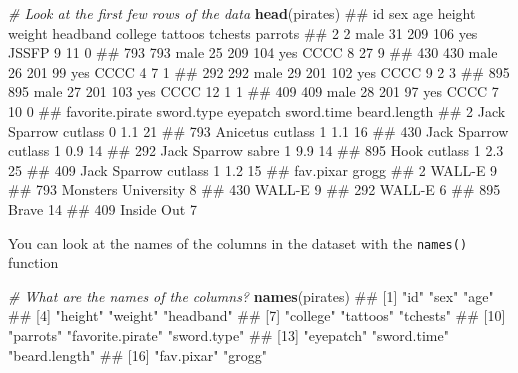 \documentclass[]{book}
\newenvironment{Shaded}{\begin{snugshade}}{\end{snugshade}}
\newcommand{\KeywordTok}[1]{\textcolor[rgb]{0.13,0.29,0.53}{\textbf{#1}}}
\newcommand{\CommentTok}[1]{\textcolor[rgb]{0.56,0.35,0.01}{\textit{#1}}}
\newcommand{\NormalTok}[1]{#1}
\theoremstyle{definition}
\theoremstyle{definition}
\theoremstyle{remark}
\begin{document}
\begin{Shaded}
\begin{Highlighting}[]
\CommentTok{# Look at the first few rows of the data}
\KeywordTok{head}\NormalTok{(pirates)}
\NormalTok{##      id  sex age height weight headband college tattoos tchests parrots}
\NormalTok{## 2     2 male  31    209    106      yes   JSSFP       9      11       0}
\NormalTok{## 793 793 male  25    209    104      yes    CCCC       8      27       9}
\NormalTok{## 430 430 male  26    201     99      yes    CCCC       4       7       1}
\NormalTok{## 292 292 male  29    201    102      yes    CCCC       9       2       3}
\NormalTok{## 895 895 male  27    201    103      yes    CCCC      12       1       1}
\NormalTok{## 409 409 male  28    201     97      yes    CCCC       7      10       0}
\NormalTok{##     favorite.pirate sword.type eyepatch sword.time beard.length}
\NormalTok{## 2      Jack Sparrow    cutlass        0        1.1           21}
\NormalTok{## 793        Anicetus    cutlass        1        1.1           16}
\NormalTok{## 430    Jack Sparrow    cutlass        1        0.9           14}
\NormalTok{## 292    Jack Sparrow      sabre        1        9.9           14}
\NormalTok{## 895            Hook    cutlass        1        2.3           25}
\NormalTok{## 409    Jack Sparrow    cutlass        1        1.2           15}
\NormalTok{##               fav.pixar grogg}
\NormalTok{## 2                WALL-E     9}
\NormalTok{## 793 Monsters University     8}
\NormalTok{## 430              WALL-E     9}
\NormalTok{## 292              WALL-E     6}
\NormalTok{## 895               Brave    14}
\NormalTok{## 409          Inside Out     7}
\end{Highlighting}
\end{Shaded}

You can look at the names of the columns in the dataset with the
\texttt{names()} function

\begin{Shaded}
\begin{Highlighting}[]
\CommentTok{# What are the names of the columns?}
\KeywordTok{names}\NormalTok{(pirates)}
\NormalTok{##  [1] "id"              "sex"             "age"            }
\NormalTok{##  [4] "height"          "weight"          "headband"       }
\NormalTok{##  [7] "college"         "tattoos"         "tchests"        }
\NormalTok{## [10] "parrots"         "favorite.pirate" "sword.type"     }
\NormalTok{## [13] "eyepatch"        "sword.time"      "beard.length"   }
\NormalTok{## [16] "fav.pixar"       "grogg"}
\end{Highlighting}
\end{Shaded}
\end{document}
